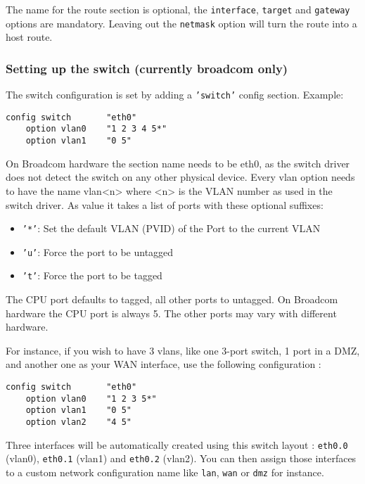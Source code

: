 The name for the route section is optional, the \texttt{interface}, \texttt{target} and 
\texttt{gateway} options are mandatory.
Leaving out the \texttt{netmask} option will turn the route into a host route.

\subsubsection{Setting up the switch (currently broadcom only)}

The switch configuration is set by adding a \texttt{'switch'} config section.
Example:

\begin{Verbatim}
config switch       "eth0"
    option vlan0    "1 2 3 4 5*"
    option vlan1    "0 5"
\end{Verbatim}

On Broadcom hardware the section name needs to be eth0, as the switch driver
does not detect the switch on any other physical device.
Every vlan option needs to have the name vlan<n> where <n> is the VLAN number
as used in the switch driver.
As value it takes a list of ports with these optional suffixes:

\begin{itemize}
    \item{\texttt{'*'}:}
        Set the default VLAN (PVID) of the Port to the current VLAN
    \item{\texttt{'u'}:}
        Force the port to be untagged
    \item{\texttt{'t'}:}
        Force the port to be tagged
\end{itemize}

The CPU port defaults to tagged, all other ports to untagged.
On Broadcom hardware the CPU port is always 5. The other ports may vary with
different hardware.

For instance, if you wish to have 3 vlans, like one 3-port switch, 1 port in a
DMZ, and another one as your WAN interface, use the following configuration :

\begin{Verbatim}
config switch       "eth0"
    option vlan0    "1 2 3 5*"
    option vlan1    "0 5"
    option vlan2    "4 5"
\end{Verbatim}

Three interfaces will be automatically created using this switch layout :
\texttt{eth0.0} (vlan0), \texttt{eth0.1} (vlan1) and \texttt{eth0.2} (vlan2).
You can then assign those interfaces to a custom network configuration name
like \texttt{lan}, \texttt{wan} or \texttt{dmz} for instance.

